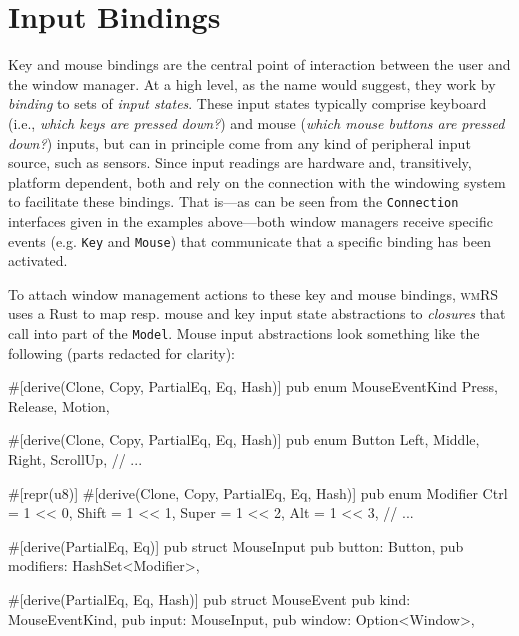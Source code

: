 \section{Input Bindings}

Key and mouse bindings are the central point of interaction between the user and
the window manager. At a high level, as the name would suggest, they work by
\textit{binding} to sets of \textit{input states}. These input states typically
comprise keyboard (i.e., \textit{which keys are pressed down?}) and mouse
(\textit{which mouse buttons are pressed down?}) inputs, but can in principle
come from any kind of peripheral input source, such as sensors. Since input
readings are hardware and, transitively, platform dependent, both \wmrs and
\wmcpp rely on the connection with the windowing system to facilitate these
bindings. That is---as can be seen from the \texttt{Connection} interfaces given
in the examples above---both window managers receive specific events (e.g.
\texttt{Key} and \texttt{Mouse}) that communicate that a specific binding has
been activated.


To attach window management actions to these key and mouse bindings,
\textsc{wmRS} uses a Rust  to map resp. mouse and key input state
abstractions to \textit{closures} that call into part of the \texttt{Model}.
Mouse input abstractions look something like the following (parts redacted for
clarity):

\begin{rustblock}
  #[derive(Clone, Copy, PartialEq, Eq, Hash)]
  pub enum MouseEventKind {
    Press, Release, Motion,
  }
\end{rustblock}
\begin{rustblock}
  #[derive(Clone, Copy, PartialEq, Eq, Hash)]
  pub enum Button {
    Left, Middle, Right, ScrollUp, // ...
  }
\end{rustblock}
\begin{rustblock}
  #[repr(u8)]
  #[derive(Clone, Copy, PartialEq, Eq, Hash)]
  pub enum Modifier {
    Ctrl = 1 << 0, Shift = 1 << 1,
    Super = 1 << 2, Alt = 1 << 3, // ...
  }
\end{rustblock}
\begin{rustblock}
  #[derive(PartialEq, Eq)]
  pub struct MouseInput {
    pub button: Button,
    pub modifiers: HashSet<Modifier>,
  }
\end{rustblock}
\begin{rustblock}
  #[derive(PartialEq, Eq, Hash)]
  pub struct MouseEvent {
    pub kind: MouseEventKind,
    pub input: MouseInput,
    pub window: Option<Window>,
  }
\end{rustblock}

